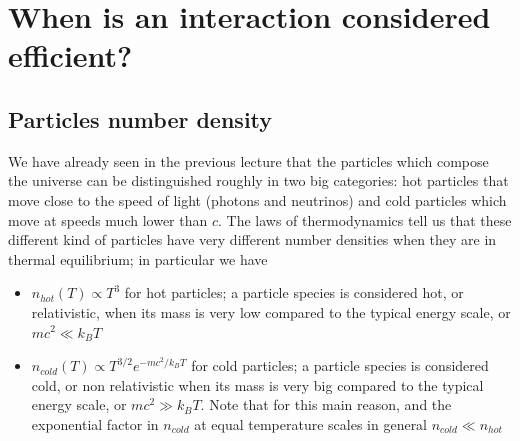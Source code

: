 \section{When is an interaction considered efficient?}
\subsection{Particles number density}
\label{densities}
We have already seen in the previous lecture that the particles which compose the universe can be distinguished roughly in two big categories: hot particles that move close to the speed of light (photons and neutrinos) and cold particles which move at speeds much lower than $c$. The laws of thermodynamics tell us that these different kind of particles have very different number densities when they are in thermal equilibrium; in particular we have
\begin{itemize}
\item $n_{hot}(T)\propto T^3$ for hot particles; a particle species is considered hot, or relativistic, when its mass is very low compared to the typical energy scale, or $mc^2\ll k_BT$
\item $n_{cold}(T)\propto T^{3/2}e^{-mc^2/k_BT}$ for cold particles; a particle species is considered cold, or non relativistic when its mass is very big compared to the typical energy scale, or $mc^2\gg k_BT$. Note that for this main reason, and the exponential factor in $n_{cold}$ at equal temperature scales in general $n_{cold}\ll n_{hot}$
\end{itemize} 

